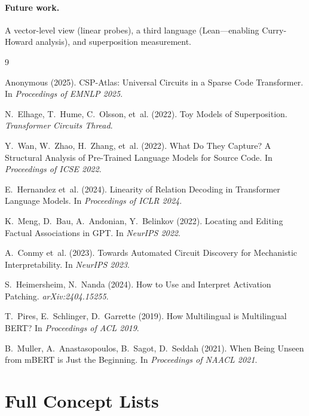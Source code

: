 \documentclass[11pt]{article}
\begin{document}
\paragraph{Future work.} A vector-level view (linear probes), a third language (Lean---enabling Curry-Howard analysis), and superposition measurement.


\begin{thebibliography}{9}

Anonymous (2025).
\newblock CSP-Atlas: Universal Circuits in a Sparse Code Transformer.
\newblock In \textit{Proceedings of EMNLP 2025}.

N.~Elhage, T.~Hume, C.~Olsson, et~al. (2022).
\newblock Toy Models of Superposition.
\newblock \textit{Transformer Circuits Thread}.

Y.~Wan, W.~Zhao, H.~Zhang, et~al. (2022).
\newblock What Do They Capture? A Structural Analysis of Pre-Trained Language Models for Source Code.
\newblock In \textit{Proceedings of ICSE 2022}.

E.~Hernandez et~al. (2024).
\newblock Linearity of Relation Decoding in Transformer Language Models.
\newblock In \textit{Proceedings of ICLR 2024}.

K.~Meng, D.~Bau, A.~Andonian, Y.~Belinkov (2022).
\newblock Locating and Editing Factual Associations in GPT.
\newblock In \textit{NeurIPS 2022}.

A.~Conmy et~al. (2023).
\newblock Towards Automated Circuit Discovery for Mechanistic Interpretability.
\newblock In \textit{NeurIPS 2023}.

S.~Heimersheim, N.~Nanda (2024).
\newblock How to Use and Interpret Activation Patching.
\newblock \textit{arXiv:2404.15255}.

T.~Pires, E.~Schlinger, D.~Garrette (2019).
\newblock How Multilingual is Multilingual BERT?
\newblock In \textit{Proceedings of ACL 2019}.

B.~Muller, A.~Anastasopoulos, B.~Sagot, D.~Seddah (2021).
\newblock When Being Unseen from mBERT is Just the Beginning.
\newblock In \textit{Proceedings of NAACL 2021}.

\end{thebibliography}

\appendix

\section{Full Concept Lists}
\end{document}

